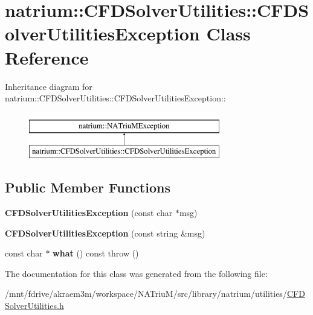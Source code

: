 \hypertarget{classnatrium_1_1CFDSolverUtilities_1_1CFDSolverUtilitiesException}{
\section{natrium::CFDSolverUtilities::CFDSolverUtilitiesException Class Reference}
\label{classnatrium_1_1CFDSolverUtilities_1_1CFDSolverUtilitiesException}
}
Inheritance diagram for natrium::CFDSolverUtilities::CFDSolverUtilitiesException::\begin{figure}[H]
\begin{center}
\leavevmode
\includegraphics[height=2cm]{classnatrium_1_1CFDSolverUtilities_1_1CFDSolverUtilitiesException}
\end{center}
\end{figure}
\subsection*{Public Member Functions}
\begin{DoxyCompactItemize}
\item 
\hypertarget{classnatrium_1_1CFDSolverUtilities_1_1CFDSolverUtilitiesException_a19add4b16c155613f9d8a2fc72bbeca9}{
{\bfseries CFDSolverUtilitiesException} (const char $\ast$msg)}
\label{classnatrium_1_1CFDSolverUtilities_1_1CFDSolverUtilitiesException_a19add4b16c155613f9d8a2fc72bbeca9}

\item 
\hypertarget{classnatrium_1_1CFDSolverUtilities_1_1CFDSolverUtilitiesException_acf6fcdce9460af595b457d6830353d9d}{
{\bfseries CFDSolverUtilitiesException} (const string \&msg)}
\label{classnatrium_1_1CFDSolverUtilities_1_1CFDSolverUtilitiesException_acf6fcdce9460af595b457d6830353d9d}

\item 
\hypertarget{classnatrium_1_1CFDSolverUtilities_1_1CFDSolverUtilitiesException_a548a8cb9bd2c52753a7c334836ae9865}{
const char $\ast$ {\bfseries what} () const   throw ()}
\label{classnatrium_1_1CFDSolverUtilities_1_1CFDSolverUtilitiesException_a548a8cb9bd2c52753a7c334836ae9865}

\end{DoxyCompactItemize}


The documentation for this class was generated from the following file:\begin{DoxyCompactItemize}
\item 
/mnt/fdrive/akraem3m/workspace/NATriuM/src/library/natrium/utilities/\hyperlink{CFDSolverUtilities_8h}{CFDSolverUtilities.h}\end{DoxyCompactItemize}
